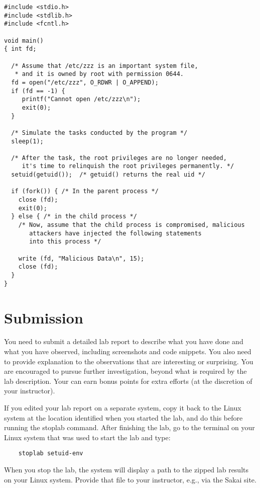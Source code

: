 \begin{Verbatim}[frame=single]
#include <stdio.h>
#include <stdlib.h>
#include <fcntl.h>

void main()
{ int fd;

  /* Assume that /etc/zzz is an important system file,
   * and it is owned by root with permission 0644.
  fd = open("/etc/zzz", O_RDWR | O_APPEND);
  if (fd == -1) {
     printf("Cannot open /etc/zzz\n");
     exit(0);
  }

  /* Simulate the tasks conducted by the program */
  sleep(1);

  /* After the task, the root privileges are no longer needed,
     it's time to relinquish the root privileges permanently. */
  setuid(getuid());  /* getuid() returns the real uid */

  if (fork()) { /* In the parent process */
    close (fd);
    exit(0);
  } else { /* in the child process */
    /* Now, assume that the child process is compromised, malicious
       attackers have injected the following statements
       into this process */

    write (fd, "Malicious Data\n", 15);
    close (fd);
  }
}
\end{Verbatim}



\section{Submission}


You need to submit a detailed lab report to describe what you have done and
what you have observed, including screenshots and code snippets.
You also need to provide explanation to the
observations that are interesting or surprising. You are encouraged to
pursue further investigation, beyond what is required by the lab
description. Your can earn bonus points for extra efforts (at the
discretion of your instructor).

If you edited your lab report on a separate system, copy it back to the Linux system at the location
identified when you started the lab, and do this before running the stoplab command.
After finishing the lab, go to the terminal on your Linux system that was used to start the lab and type:
\begin{verbatim}
    stoplab setuid-env
\end{verbatim}
When you stop the lab, the system will display a path to the zipped lab results on your Linux system.  Provide that file to
your instructor, e.g., via the Sakai site.




